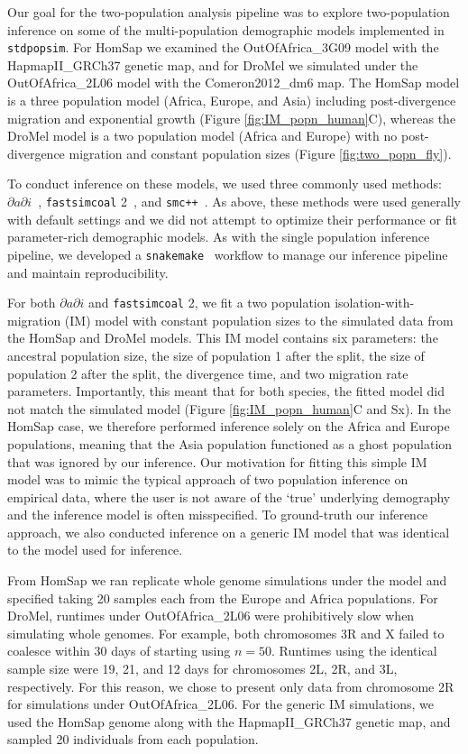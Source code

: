 \documentclass[12pt,halfline,a4paper]{ouparticle}
\newcommand{\stdpopsim}{\texttt{stdpopsim}\xspace}
\newcommand{\dadi}{$\partial a \partial i$\xspace}
\newcommand{\smcpp}{\texttt{smc++}\xspace}
\newcommand{\fastsimcoal}{\texttt{fastsimcoal}\xspace}
\begin{document}
Our goal for the two-population analysis pipeline was to explore two-population inference
on some of the multi-population demographic models implemented in \stdpopsim.
For HomSap we examined the OutOfAfrica\_3G09 model with the HapmapII\_GRCh37 genetic map,
and for DroMel we simulated under the OutOfAfrica\_2L06 model with the Comeron2012\_dm6 map.
The HomSap model is a three population model (Africa, Europe, and Asia) including post-divergence
migration and exponential growth (Figure \ref{fig:IM_popn_human}C), whereas the
DroMel model is a two population model (Africa and Europe) with no post-divergence
migration and constant population sizes (Figure \ref{fig:two_popn_fly}).

To conduct inference on these models, we used three commonly used methods:
\dadi~\citep{gutenkunst2009inferring}, \fastsimcoal2~\citep{excoffier2013robust},
and \smcpp~\citep{terhorst2017robust}. As above, these methods were used
generally with default settings and we did not attempt to optimize their performance or fit
parameter-rich demographic models. As with the single population inference pipeline,
we developed a \texttt{snakemake}~\citep{koster2012snakemake} workflow to manage
our inference pipeline and maintain reproducibility.

For both \dadi and \fastsimcoal2, we fit a two population
isolation-with-migration (IM) model with constant population sizes to the simulated
data from the HomSap and DroMel models. This IM model contains six parameters:
the ancestral population size, the size of population 1 after the split, the size of
population 2 after the split, the divergence time, and two migration rate parameters.
Importantly, this meant that for both species, the
fitted model did not match the simulated model (Figure \ref{fig:IM_popn_human}C and Sx).
In the HomSap case, we therefore performed inference solely on the Africa
and Europe populations, meaning that the Asia population functioned as a ghost
population that was ignored by our inference. Our motivation for fitting this simple
IM model was to mimic the typical approach of two population inference on empirical
data, where the user is not aware of the `true' underlying demography and the inference
model is often misspecified. To ground-truth our inference approach, we also conducted
inference on a generic IM model that was identical to the model used for inference.

From HomSap we ran replicate whole genome simulations under the model
and specified taking 20 samples each from the Europe and Africa populations.
For DroMel, runtimes under OutOfAfrica\_2L06 were prohibitively slow when simulating whole genomes.
For example, both chromosomes 3R and X failed to coalesce within 30 days of starting using $n = 50$.
Runtimes using the identical sample size were 19, 21, and 12 days for chromosomes 2L, 2R, and 3L,
respectively. For this reason, we chose to present only data from chromosome 2R for simulations
under OutOfAfrica\_2L06. For the generic IM simulations, we used the HomSap genome along with the
HapmapII\_GRCh37 genetic map, and sampled 20 individuals from each population.
\end{document}
